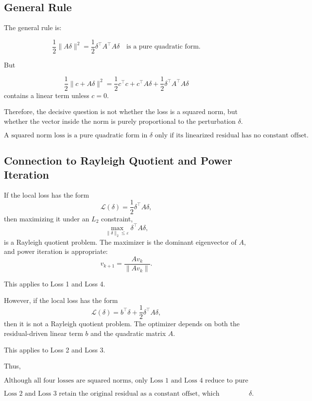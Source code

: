 \documentclass{article}
\begin{document}
\subsection{General Rule}

The general rule is:

\[
\boxed{
\frac{1}{2}\|A\delta\|^2
=
\frac{1}{2}\delta^\top A^\top A\delta
\quad
\text{is a pure quadratic form.}
}
\]

But

\[
\boxed{
\frac{1}{2}\|c+A\delta\|^2
=
\frac{1}{2}c^\top c
+
c^\top A\delta
+
\frac{1}{2}\delta^\top A^\top A\delta
}
\]
contains a linear term unless \(c=0\).

Therefore, the decisive question is not whether the loss is a squared norm, but whether the vector inside the norm is purely proportional to the perturbation \(\delta\).

\[
\boxed{
\text{A squared norm loss is a pure quadratic form in } \delta
\text{ only if its linearized residual has no constant offset.}
}
\]

\subsection{Connection to Rayleigh Quotient and Power Iteration}

If the local loss has the form
\[
    \mathcal L(\delta)
    =
    \frac{1}{2}\delta^\top A\delta,
\]
then maximizing it under an \(L_2\) constraint,
\[
    \max_{\|\delta\|_2\le \varepsilon}
    \delta^\top A\delta,
\]
is a Rayleigh quotient problem. The maximizer is the dominant eigenvector of \(A\), and power iteration is appropriate:
\[
    v_{k+1}
    =
    \frac{Av_k}{\|Av_k\|}.
\]

This applies to Loss 1 and Loss 4.

However, if the local loss has the form
\[
    \mathcal L(\delta)
    =
    b^\top\delta
    +
    \frac{1}{2}\delta^\top A\delta,
\]
then it is not a Rayleigh quotient problem. The optimizer depends on both the residual-driven linear term \(b\) and the quadratic matrix \(A\).

This applies to Loss 2 and Loss 3.

Thus,

\[
\boxed{
\text{Although all four losses are squared norms, only Loss 1 and Loss 4 reduce to pure quadratic forms under local linearization.}
}
\]

\[
\boxed{
\text{Loss 2 and Loss 3 retain the original residual as a constant offset, which generates a linear term in } \delta.
}
\]
\end{document}
